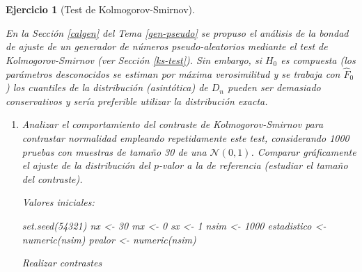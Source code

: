 \documentclass[
  10pt,
]{book}
\newenvironment{Shaded}{\begin{snugshade}}{\end{snugshade}}
\newcommand{\ControlFlowTok}[1]{\textcolor[rgb]{0.13,0.29,0.53}{\textbf{#1}}}
\newcommand{\DecValTok}[1]{\textcolor[rgb]{0.00,0.00,0.81}{#1}}
\newcommand{\FunctionTok}[1]{\textcolor[rgb]{0.00,0.00,0.00}{#1}}
\newcommand{\NormalTok}[1]{#1}
\newcommand{\OtherTok}[1]{\textcolor[rgb]{0.56,0.35,0.01}{#1}}
\newcommand{\SpecialCharTok}[1]{\textcolor[rgb]{0.00,0.00,0.00}{#1}}
\newcommand{\StringTok}[1]{\textcolor[rgb]{0.31,0.60,0.02}{#1}}
\theoremstyle{break}
\newtheorem{exercise}{Ejercicio}[chapter]
\theoremstyle{nonumberplain}
\begin{document}
\begin{exercise}[Test de Kolmogorov-Smirnov]
\protect\hypertarget{exr:ks-test-sim}{}\label{exr:ks-test-sim}

En la Sección \ref{calgen} del Tema \ref{gen-pseudo} se propuso el análisis de la bondad de ajuste de un generador de números pseudo-aleatorios mediante el test de Kolmogorov-Smirnov (ver Sección \ref{ks-test}).
Sin embargo, si \(H_{0}\) es compuesta (los parámetros desconocidos se estiman por máxima verosimilitud y se trabaja con \(\hat{F}_{0}\)) los cuantiles de la distribución (asintótica) de \(D_{n}\) pueden ser demasiado conservativos y sería preferible utilizar la distribución exacta.

\begin{enumerate}
\def\labelenumi{\alph{enumi})}
\item
  Analizar el comportamiento del contraste de Kolmogorov-Smirnov
  para contrastar normalidad empleando repetidamente este test,
  considerando 1000 pruebas con muestras de tamaño 30 de
  una \(\mathcal{N}(0,1)\). Comparar gráficamente el ajuste
  de la distribución del \(p\)-valor a la de referencia
  (estudiar el tamaño del contraste).

  Valores iniciales:

\begin{Shaded}
\begin{Highlighting}[]
\FunctionTok{set.seed}\NormalTok{(}\DecValTok{54321}\NormalTok{)}
\NormalTok{nx }\OtherTok{\textless{}{-}} \DecValTok{30}
\NormalTok{mx }\OtherTok{\textless{}{-}} \DecValTok{0}
\NormalTok{sx }\OtherTok{\textless{}{-}} \DecValTok{1}
\NormalTok{nsim }\OtherTok{\textless{}{-}} \DecValTok{1000}
\NormalTok{estadistico }\OtherTok{\textless{}{-}} \FunctionTok{numeric}\NormalTok{(nsim)}
\NormalTok{pvalor }\OtherTok{\textless{}{-}} \FunctionTok{numeric}\NormalTok{(nsim)}
\end{Highlighting}
\end{Shaded}

  Realizar contrastes

\begin{Shaded}
\end{Shaded}


\end{enumerate}
\end{exercise}
\end{document}
